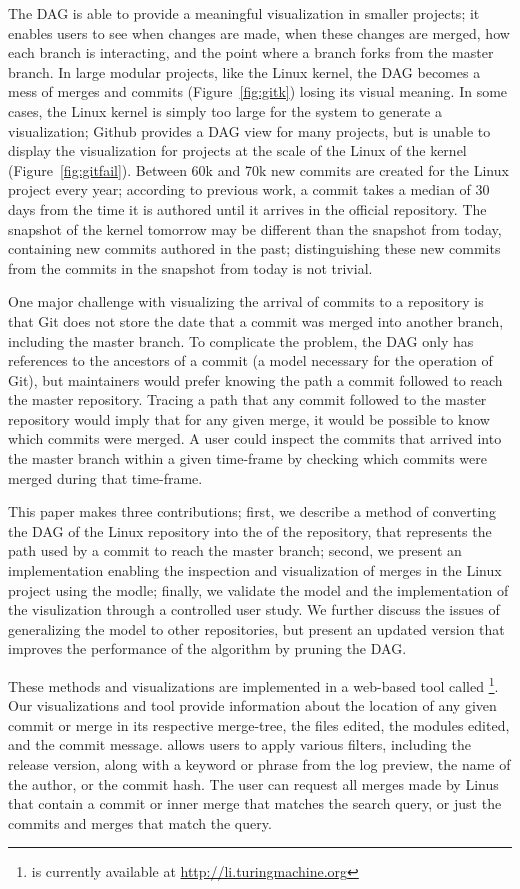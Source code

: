The DAG is able to provide a meaningful visualization in smaller
projects; it enables users to see when changes are made, when these
changes are merged, how each branch is interacting, and the point where
a branch forks from the master branch. In large modular projects, like
the Linux kernel, the DAG becomes a mess of merges and commits
(Figure~\ref{fig:gitk}) losing its visual meaning. In some cases, the
Linux kernel is simply too large for the system to generate a
visualization; Github provides a DAG view for many projects, but is
unable to display the visualization for projects at the scale of the
Linux of the kernel (Figure~\ref{fig:gitfail}). Between 60k and 70k new
commits are created for the Linux project every year; according to
previous work\cite{German2015}, a commit takes a median of 30 days from
the time it is authored until it arrives in the official repository. The
snapshot of the kernel tomorrow may be different than the snapshot from
today, containing new commits authored in the past; distinguishing these
new commits from the commits in the snapshot from today is not trivial.

One major challenge with visualizing the arrival of commits to a
repository is that Git does not store the date that a commit was merged
into another branch, including the master branch. To complicate the
problem, the DAG only has references to the ancestors of a commit (a
model necessary for the operation of Git), but maintainers would prefer
knowing the path a commit followed to reach the master repository.
Tracing a path that any commit followed to the master repository would
imply that for any given merge, it would be possible to know which
commits were merged. A user could inspect the commits that arrived into
the master branch within a given time-frame by checking which commits
were merged during that time-frame.

This paper makes three contributions; first, we describe a method of
converting the DAG of the Linux repository into the \mt of the
repository, that represents the path used by a commit to reach the
master branch; second, we present an implementation enabling the
inspection and visualization of merges in the Linux project using the
\mt modle; finally, we validate the \mt model and the implementation of
the visulization through a controlled user study. We further discuss the
issues of generalizing the model to other repositories, but present an
updated version that improves the performance of the algorithm by
pruning the DAG.\@

These methods and visualizations are implemented in a web-based tool
called \tool\footnote{\tool is currently available at
  \url{http://li.turingmachine.org}}. Our visualizations and tool
provide information about the location of any given commit or merge in
its respective merge-tree, the files edited, the modules edited, and the
commit message. \tool allows users to apply various filters, including
the release version, along with a keyword or phrase from the log
preview, the name of the author, or the commit hash. The user can
request all merges made by Linus that contain a commit or inner merge
that matches the search query, or just the commits and merges that match
the query.

